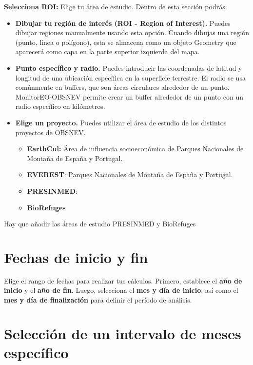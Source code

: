 \documentclass[
]{book}
\providecommand{\tightlist}{%
  \setlength{\itemsep}{0pt}\setlength{\parskip}{0pt}}
\begin{document}
\textbf{Selecciona ROI:} Elige tu área de estudio. Dentro de esta sección podrás:

\begin{itemize}
\tightlist
\item
  \textbf{Dibujar tu región de interés (ROI - Region of Interest).} Puedes dibujar regiones manualmente usando esta opción. Cuando dibujas una región (punto, línea o polígono), esta se almacena como un objeto Geometry que aparecerá como capa en la parte superior izquierda del mapa.\\
\item
  \textbf{Punto específico y radio.} Puedes introducir las coordenadas de latitud y longitud de una ubicación específica en la superficie terrestre. El radio se usa comúnmente en buffers, que son áreas circulares alrededor de un punto. MonitorEO-OBSNEV permite crear un buffer alrededor de un punto con un radio específico en kilómetros.\\
\item
  \textbf{Elige un proyecto.} Puedes utilizar el área de estudio de los distintos proyectos de OBSNEV.

  \begin{itemize}
  \tightlist
  \item
    \textbf{EarthCul:} Área de influencia socioeconómica de Parques Nacionales de Montaña de España y Portugal.\\
  \item
    \textbf{EVEREST}: Parques Nacionales de Montaña de España y Portugal.\\
  \item
    \textbf{PRESINMED}:\\
  \item
    \textbf{BioRefuges}
  \end{itemize}
\end{itemize}

Hay que añadir las áreas de estudio PRESINMED y BioRefuges

\chapter{Fechas de inicio y fin}\label{fechas}

Elige el rango de fechas para realizar tus cálculos. Primero, establece el \textbf{año de inicio} y el \textbf{año de fin}. Luego, selecciona el \textbf{mes y día de inicio}, así como el \textbf{mes y día de finalización} para definir el período de análisis.

\chapter{Selección de un intervalo de meses específico}\label{periodo}
\end{document}

